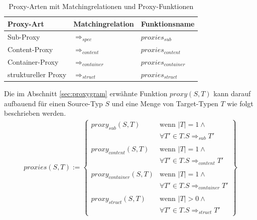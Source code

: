 \documentclass[a4paper,12pt]{article}
\begin{document}
\begin{table}[H]
\centering
\begin{tabular}{|p{4cm}|p{4cm}|p{3cm}|}
\hline
\hline
\centering\textbf{Proxy-Art} & \textbf{Matchingrelation} & \textbf{Funktionsname}\\
\hline
\hline
Sub-Proxy
&  
$\Rightarrow_{spec}$
& 
$\mathit{proxies_{sub}}$
\\
\hline
Content-Proxy
& 
$\Rightarrow_{content}$
& 
$\mathit{proxies_{content}}$
\\
\hline
Container-Proxy
& 
$\Rightarrow_{container}$
& 
$\mathit{proxies_{container}}$
\\
\hline
struktureller Proxy
&
$\Rightarrow_{struct}$
& 
$\mathit{proxies_{struct}}$
 \\
\hline
\hline
\end{tabular}
\caption{Proxy-Arten mit Matchingrelationen und Proxy-Funktionen}
 \label{tab:baseMatcher}
\end{table}
\noindent
Die im Abschnitt \ref{sec:proxygram} erwähnte Funktion $\mathit{proxy(S,T)}$ kann darauf aufbauend für einen Source-Typ $S$ und eine Menge von Target-Typen $T$ wie folgt beschrieben werden.
\begin{gather*}
\mathit{proxies(S,T)} := 
\left\{\begin{array}{ll}
\mathit{proxy_{sub}(S,T)}	& \text{wenn } |T| = 1 \wedge \mathit{ }\\
& \forall T' \in T. S \Rightarrow_{sub} T'\\	
&\\
\mathit{proxy_{content}(S,T)}	& \text{wenn } |T| = 1 \wedge \mathit{ }\\
& \forall T' \in T. S \Rightarrow_{content} T' \\
&\\
\mathit{proxy_{container}(S,T)} & \text{wenn } |T| = 1 \wedge \mathit{ } \\
& \forall T' \in T. S \Rightarrow_{container} T' \\
&\\
\mathit{proxy_{struct}(S,T)} & \text{wenn } |T| > 0 \wedge \mathit{ } \\
&\forall T' \in T. S \Rightarrow_{struct} T'
		 \end{array}
\right\}
\end{gather*}
\end{document}
